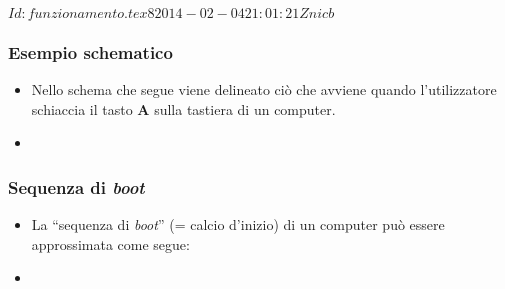 %
%
%
%
%
\svnInfo $Id: funzionamento.tex 8 2014-02-04 21:01:21Z nicb $

\setcounter{ms}{1}
\begin{frame}
    \frametitle{Esempio schematico}

	\begin{itemize}
	
		\item Nello schema che segue viene delineato
			  ci\`o che avviene quando l'utilizzatore
              schiaccia il tasto {\bfseries A} sulla tastiera
              di un computer.

    \item[~]
			  \begin{center}
			  \end{center}

	\end{itemize}

\end{frame}


\begin{frame}
    \frametitle{Sequenza di \emph{boot}}

	\begin{itemize}
	
		\item La ``sequenza di \emph{boot}'' (= calcio d'inizio)
			  di un computer pu\`o essere approssimata come segue:

    \item[~]
			  \begin{center}
			  \end{center}

	\end{itemize}

\end{frame}
